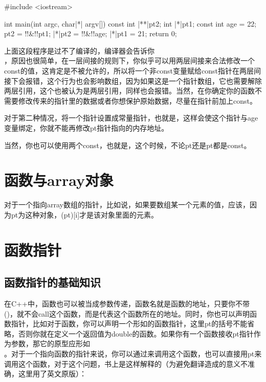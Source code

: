 \begin{cpp}
#include <iostream>

int main(int argc, char|*| argv[]) {
    const int |**|pt2;
    int |*|pt1;
    const int age = 22;
    pt2 = !!&!!pt1;
    |*|pt2 = !!&!!age;
    |*|pt1 = 21;
    return 0;
}
\end{cpp}

上面这段程序是过不了编译的，编译器会告诉你\\ ，原因也很简单，在一层间接的规则下，你似乎可以用两层间接来合法修改一个const的值，这肯定是不被允许的，所以将一个非const变量赋给const指针在两层间接下会报错，这个行为也会影响数组，因为如果这是一个指针数组，它也需要解除两层引用，这个也被认为是两层引用，同样也会报错。当然，在你确定你的函数不需要修改传来的指针里的数据或者你想保护原始数据，尽量在指针前加上const。

对于第二种情况，将一个指针设置成常量指针，也就是，这样会使这个指针与age变量绑定，你就不能再修改pt指针指向的内存地址。

当然，你也可以使用两个const，也就是，这个时候，不论pt还是\thinspace\mbox{\fira{*}}pt都是const。

\addtocounter{section}{5}

\section{函数与array对象}

对于一个指向array数组的指针，比如说，如果要数组某一个元素的值，应该，因为\thinspace\mbox{\fira{*}}pt为这种对象，(\fira{*}pt)[i]才是该对象里面的元素。

\addtocounter{section}{1}

\section{函数指针}

\subsection{函数指针的基础知识}

在C++中，函数也可以被当成参数传递，函数名就是函数的地址，只要你不带()，就不会call这个函数，而是代表这个函数所在的地址。同时，你也可以声明函数指针，比如对于函数，你可以声明一个形如的函数指针，这里\thinspace\mbox{\fira{*}}pt的括号不能省略，否则你就在定义一个返回值为double\fira{*}的函数。如果你有一个函数接收pt指针作为参数，那它的原型应形如\\ \codeline{));}。对于一个指向函数的指针来说，你可以通过来调用这个函数，也可以直接用pt来调用这个函数，对于这个问题，书上是这样解释的（为避免翻译造成的意义不准确，这里用了英文原版）：

